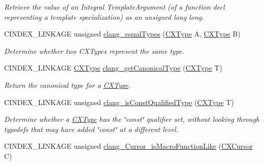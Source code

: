 \begin{DoxyCompactItemize}
\begin{DoxyCompactList}\small\item\em Retrieve the value of an Integral Template\+Argument (of a function decl representing a template specialization) as an unsigned long long. \end{DoxyCompactList}\item 
C\+I\+N\+D\+E\+X\+\_\+\+L\+I\+N\+K\+A\+GE unsigned \mbox{\hyperlink{group__CINDEX__TYPES_gac047de2ab0f7e1b1586d8317a658a1d9}{clang\+\_\+equal\+Types}} (\mbox{\hyperlink{structCXType}{C\+X\+Type}} A, \mbox{\hyperlink{structCXType}{C\+X\+Type}} B)
\begin{DoxyCompactList}\small\item\em Determine whether two C\+X\+Types represent the same type. \end{DoxyCompactList}\item 
C\+I\+N\+D\+E\+X\+\_\+\+L\+I\+N\+K\+A\+GE \mbox{\hyperlink{structCXType}{C\+X\+Type}} \mbox{\hyperlink{group__CINDEX__TYPES_gaa9815d77adc6823c58be0a0e32010f8c}{clang\+\_\+get\+Canonical\+Type}} (\mbox{\hyperlink{structCXType}{C\+X\+Type}} T)
\begin{DoxyCompactList}\small\item\em Return the canonical type for a \mbox{\hyperlink{structCXType}{C\+X\+Type}}. \end{DoxyCompactList}\item 
\mbox{\label{group__CINDEX__TYPES_ga8c3f8029254d5862bcd595d6c8778e5b}} 
C\+I\+N\+D\+E\+X\+\_\+\+L\+I\+N\+K\+A\+GE unsigned \mbox{\hyperlink{group__CINDEX__TYPES_ga8c3f8029254d5862bcd595d6c8778e5b}{clang\+\_\+is\+Const\+Qualified\+Type}} (\mbox{\hyperlink{structCXType}{C\+X\+Type}} T)
\begin{DoxyCompactList}\small\item\em Determine whether a \mbox{\hyperlink{structCXType}{C\+X\+Type}} has the \char`\"{}const\char`\"{} qualifier set, without looking through typedefs that may have added \char`\"{}const\char`\"{} at a different level. \end{DoxyCompactList}\item 
\mbox{\label{group__CINDEX__TYPES_ga0fcb19b77fa3eb1dd531bb8f20f65e6c}} 
C\+I\+N\+D\+E\+X\+\_\+\+L\+I\+N\+K\+A\+GE unsigned \mbox{\hyperlink{group__CINDEX__TYPES_ga0fcb19b77fa3eb1dd531bb8f20f65e6c}{clang\+\_\+\+Cursor\+\_\+is\+Macro\+Function\+Like}} (\mbox{\hyperlink{structCXCursor}{C\+X\+Cursor}} C)

\end{DoxyCompactItemize}
